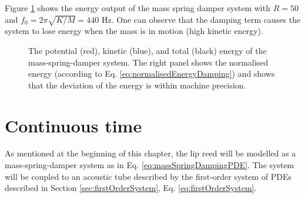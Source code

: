 Figure \ref{fig:massSpringDamperEnergy} shows the energy output of the mass spring damper system with $R = 50$ and $f_0 = 2\pi\sqrt{K/M} = 440$ Hz. One can observe that the damping term causes the system to lose energy when the mass is in motion (high kinetic energy).
\begin{figure}[h]
    \centering
      \caption{The potential (red), kinetic (blue), and total (black) energy of the mass-spring-damper system. The right panel shows the normalised energy (according to Eq. \eqref{eq:normalisedEnergyDamping}) and shows that the deviation of the energy is within machine precision. \label{fig:massSpringDamperEnergy}}
\end{figure}

\section{Continuous time}\label{sec:lipreedContinuous}
As mentioned at the beginning of this chapter, the lip reed will be modelled as a mass-spring-damper system as in Eq. \eqref{eq:massSpringDampingPDE}. The system will be coupled to an acoustic tube described by the first-order system of PDEs described in Section \ref{sec:firstOrderSystem}, Eq. \eqref{eq:firstOrderSystem}.

